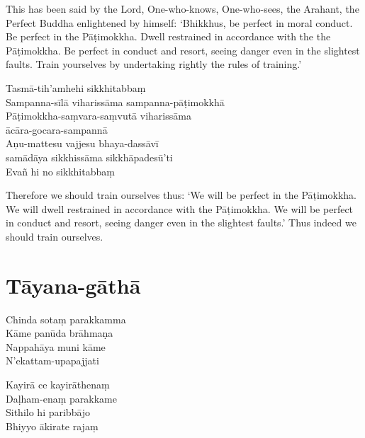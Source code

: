 
\begin{english}
  This has been said by the Lord, One-who-knows, One-who-sees, the Arahant, the
  Perfect Buddha enlightened by himself: `Bhikkhus, be perfect in moral
  conduct. Be perfect in the Pāṭimokkha. Dwell restrained in accordance with the
  the Pāṭimokkha. Be perfect in conduct and resort, seeing danger even in the
  slightest faults. Train yourselves by undertaking rightly the rules of training.'
\end{english}

Tasmā-tih'amhehi sikkhitabbaṃ\\
Sampanna-sīlā viharissāma sampanna-pāṭimokkhā\\
Pāṭimokkha-saṃvara-saṃvutā viharissāma\\
ācāra-gocara-sampannā\\
Aṇu-mattesu vajjesu bhaya-dassāvī\\
samādāya sikkhissāma sikkhāpadesū'ti\\
Evañ hi no sikkhitabbaṃ

\begin{english}
  Therefore we should train ourselves thus: `We will be perfect in the
  Pāṭimokkha. We will dwell restrained in accordance with the Pāṭimokkha. We
  will be perfect in conduct and resort, seeing danger even in the slightest
  faults.' Thus indeed we should train ourselves.
\end{english}


\section{Tāyana-gāthā}

\begin{leader}
\end{leader}


Chinda sotaṃ parakkamma\\
Kāme panūda brāhmaṇa\\
Nappahāya muni kāme\\
N'ekattam-upapajjati

Kayirā ce kayirāthenaṃ\\
Daḷham-enaṃ parakkame\\
Sithilo hi paribbājo\\
Bhiyyo ākirate rajaṃ

